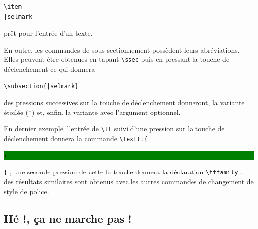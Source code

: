 \documentclass[11pt,french]{article}
\newcommand{\selmark}{\colorbox{green}{\rule[-0.5ex]{0ex}{2.1ex}\texttt{•}}}
\begin{document}
\begin{verbatim}
\item
|selmark
\end{verbatim}
prêt pour l'entrée d'un texte.

En outre, les commandes de sous-sectionnement possèdent leurs abréviations. Elles peuvent être obtenues en tapant  \verb|\ssec| puis en pressant la touche de déclenchement ce qui donnera

\begin{verbatim}
\subsection{|selmark}
\end{verbatim}
des pressions successives sur la touche de déclenchement donneront, la variante étoilée (*) et, enfin, la variante avec l'argument optionnel.

En dernier exemple, l'entrée de \verb|\tt| suivi d'une pression sur la touche de déclenchement donnera la commande \verb|\texttt{|\selmark\verb|}| ; une seconde pression de cette la touche donnera la déclaration \verb|\ttfamily| : des résultats similaires sont obtenus avec les autres commandes de changement de style de police.



\subsection{Hé !, ça ne marche pas !}
\end{document}
